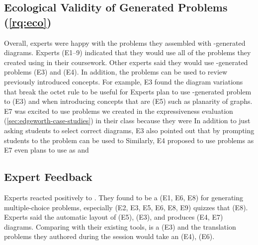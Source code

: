 \subsection{Ecological Validity of Generated Problems (\ref{rq:eco})}

Overall, experts were happy with the problems they assembled with \Edgeworth-generated diagrams. Experts (E1--9) indicated that they would use all of the problems they created using \Edgeworth in their coursework. Other experts said they would use \Edgeworth-generated problems  (E3) and  (E4). In addition, the problems can be used to review previously introduced concepts. For example, E3 found the diagram variations that break the octet rule to be useful for  Experts plan to use \Edgeworth-generated problem to  (E3) and when introducing concepts that are  (E5) such as planarity of graphs. E7 was excited to use problems we created in the expressiveness evaluation (\cref{sec:edgeworth-case-studies}) in their class because they were  In addition to just asking students to select correct diagrams, E3 also pointed out that by prompting students to  the problem can be used to  Similarly, E4 proposed to use \Edgeworth problems as  E7 even plans to use \Edgeworth as  and  

\subsection{Expert Feedback}

Experts reacted positively to \Edgeworth. They found \Edgeworth to be a  (E1, E6, E8) for generating multiple-choice problems, especially  (E2, E3, E5, E6, E8, E9) quizzes that  (E8). Experts said the automatic layout of \Edgeworth {} (E5),  (E3), and produces  (E4, E7) diagrams. Comparing with their existing tools, \Edgeworth is a  (E3) and the translation problems they authored during the session would take an  (E4),  (E6).

